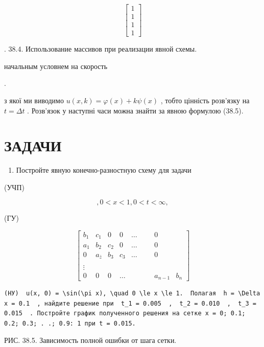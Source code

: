 \documentclass[
  ukrainian,
]{article}
\providecommand{\tightlist}{%
  \setlength{\itemsep}{0pt}\setlength{\parskip}{0pt}}
\begin{document}
\[
\begin{bmatrix} 1 \\ 1 \\ 1 \\ 1 \end{bmatrix}
\]

. 38.4. Использование массивов при реализации явной схемы.

начальным условнем на скорость

.

з якої ми виводимо \(u(x, k) = \varphi(x) + k\psi(x)\) , тобто цінність
розв'язку на \(t = \Delta t\) . Розв'язок у наступні часи можна знайти
за явною формулою (38.5).

\section{ЗАДАЧИ}\label{ux437ux430ux434ux430ux447ux438-6}

\begin{enumerate}
\def\labelenumi{\arabic{enumi}.}
\tightlist
\item
  Постройте явную конечно-разностную схему для задачи
\end{enumerate}

(УЧП)

\[
,  0 < x < 1  ,  0 < t < \infty  ,
\]

(ГУ)

\[
\begin{bmatrix} b_1 & c_1 & 0 & 0 & \dots & & & 0 \\ a_1 & b_2 & c_2 & 0 & \dots & & & 0 \\ 0 & a_{\bar{z}} & b_3 & c_3 & \dots & & & 0 \\ & & & & & & & & \\ \vdots & & & & & & & & \\ 0 & 0 & 0 & \dots & & & & a_{n-1} & b_n \end{bmatrix}
\]

\begin{verbatim}
(HУ)  u(x, 0) = \sin(\pi x), \quad 0 \le x \le 1.  Полагая  h = \Delta x = 0.1  , найдите решение при  t_1 = 0.005  ,  t_2 = 0.010  ,  t_3 = 0.015  . Постройте график полученного решения на сетке x = 0; 0.1; 0.2; 0.3; . .; 0.9: 1 при t = 0.015.
\end{verbatim}

РИС. 38.5. Зависимость полной ошибки от шага сетки.
\end{document}
